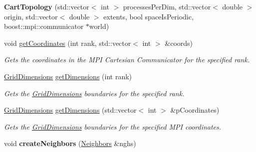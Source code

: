 \begin{DoxyCompactItemize}
\item 
\hypertarget{classrepast_1_1_cart_topology_ac6f5ad2d1539e6e9c5c4f905bd544c19}{{\bfseries Cart\-Topology} (std\-::vector$<$ int $>$ processes\-Per\-Dim, std\-::vector$<$ double $>$ origin, std\-::vector$<$ double $>$ extents, bool space\-Is\-Periodic, boost\-::mpi\-::communicator $\ast$world)}\label{classrepast_1_1_cart_topology_ac6f5ad2d1539e6e9c5c4f905bd544c19}

\item 
\hypertarget{classrepast_1_1_cart_topology_a7de71d6717688fcf67fd89409adeef90}{void \hyperlink{classrepast_1_1_cart_topology_a7de71d6717688fcf67fd89409adeef90}{get\-Coordinates} (int rank, std\-::vector$<$ int $>$ \&coords)}\label{classrepast_1_1_cart_topology_a7de71d6717688fcf67fd89409adeef90}

\begin{DoxyCompactList}\small\item\em Gets the coordinates in the M\-P\-I Cartesian Communicator for the specified rank. \end{DoxyCompactList}\item 
\hypertarget{classrepast_1_1_cart_topology_ac8e09a16688adc47670c082da1102b10}{\hyperlink{classrepast_1_1_grid_dimensions}{Grid\-Dimensions} \hyperlink{classrepast_1_1_cart_topology_ac8e09a16688adc47670c082da1102b10}{get\-Dimensions} (int rank)}\label{classrepast_1_1_cart_topology_ac8e09a16688adc47670c082da1102b10}

\begin{DoxyCompactList}\small\item\em Gets the \hyperlink{classrepast_1_1_grid_dimensions}{Grid\-Dimensions} boundaries for the specified rank. \end{DoxyCompactList}\item 
\hypertarget{classrepast_1_1_cart_topology_ac55a1b28941bedb6743c7a4977bdcea9}{\hyperlink{classrepast_1_1_grid_dimensions}{Grid\-Dimensions} \hyperlink{classrepast_1_1_cart_topology_ac55a1b28941bedb6743c7a4977bdcea9}{get\-Dimensions} (std\-::vector$<$ int $>$ \&p\-Coordinates)}\label{classrepast_1_1_cart_topology_ac55a1b28941bedb6743c7a4977bdcea9}

\begin{DoxyCompactList}\small\item\em Gets the \hyperlink{classrepast_1_1_grid_dimensions}{Grid\-Dimensions} boundaries for the specified M\-P\-I coordinates. \end{DoxyCompactList}\item 
\hypertarget{classrepast_1_1_cart_topology_adaedba511dc2fad8824ef1f64e9f073c}{void {\bfseries create\-Neighbors} (\hyperlink{classrepast_1_1_neighbors}{Neighbors} \&nghs)}\label{classrepast_1_1_cart_topology_adaedba511dc2fad8824ef1f64e9f073c}

\end{DoxyCompactItemize}


